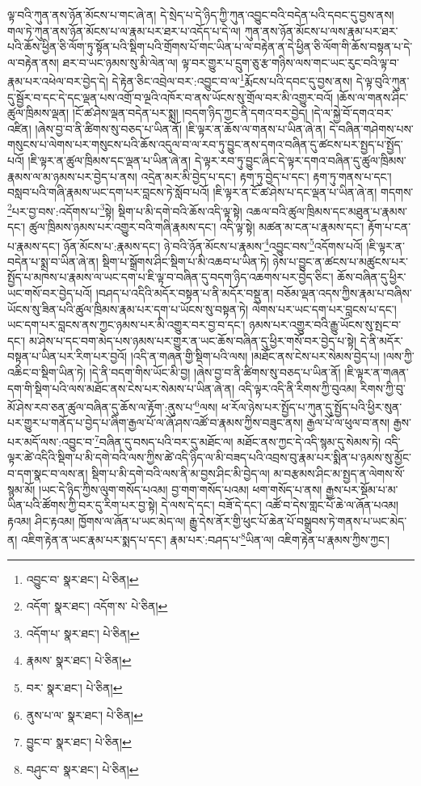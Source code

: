 ལྟ་བའི་ཀུན་ནས་ཉོན་མོངས་པ་གང་ཞེ་ན། དེ་སྲེད་པ་དེ་ཉིད་ཀྱི་ཀུན་འབྱུང་བའི་བདེན་པའི་དབང་དུ་བྱས་ནས། གལ་ཏེ་ཀུན་ནས་ཉོན་མོངས་པ་ལ་རྣམ་པར་ཐར་པ་འདོད་པ་དེ་ལ། ཀུན་ནས་ཉོན་མོངས་པ་ལས་རྣམ་པར་ཐར་པའི་ཆོས་ཕྱིན་ཅི་ལོག་ཏུ་སྟོན་པའི་སྡིག་པའི་གྲོགས་པོ་གང་ཡིན་པ་ལ་བརྟེན་ན་དེ་ཕྱིན་ཅི་ལོག་གི་ཆོས་བསྟན་པ་དེ་ལ་བརྟེན་ནས། ཐར་བ་ཡང་ཉམས་སུ་མི་ལེན་ལ། ལྟ་བར་གྱུར་པ་དྲུག་ཅུ་རྩ་གཉིས་ལས་གང་ཡང་རུང་བའི་ལྟ་བ་རྣམ་པར་འཕེལ་བར་བྱེད་དེ། དེ་རྟེན་ཅིང་འབྲེལ་བར་:འབྱུང་བ་ལ་\footnote{འབྱུང་བ་  སྣར་ཐང་།  པེ་ཅིན། }རྨོངས་པའི་དབང་དུ་བྱས་ནས། དེ་ལྟ་བུའི་ཀུན་དུ་སྦྱོར་བ་དང་དེ་དང་ལྡན་པས་འགྲོ་བ་ལྔའི་འཁོར་བ་ནས་ཡོངས་སུ་གྲོལ་བར་མི་འགྱུར་བའོ། །ཆོས་ལ་གནས་ཤིང་ཚུལ་ཁྲིམས་ལྡན། །ངོ་ཚ་ཤེས་ལྡན་བདེན་པར་སྨྲ། །བདག་ཉིད་ཀྱང་ནི་དགའ་བར་བྱེད། །དེ་ལ་སྐྱེ་བོ་དགའ་བར་འཛིན། །ཞེས་བྱ་བ་ནི་ཚིགས་སུ་བཅད་པ་ཡིན་ནོ། །ཇི་ལྟར་ན་ཆོས་ལ་གནས་པ་ཡིན་ཞེ་ན། དེ་བཞིན་གཤེགས་པས་གསུངས་པ་ལེགས་པར་གསུངས་པའི་ཆོས་འདུལ་བ་ལ་རབ་ཏུ་བྱུང་ནས་དགའ་བཞིན་དུ་ཚངས་པར་སྤྱད་པ་སྤྱོད་པའོ། །ཇི་ལྟར་ན་ཚུལ་ཁྲིམས་དང་ལྡན་པ་ཡིན་ཞེ་ན། དེ་ལྟར་རབ་ཏུ་བྱུང་ཞིང་དེ་ལྟར་དགའ་བཞིན་དུ་ཚུལ་ཁྲིམས་རྣམས་ལ་མ་ཉམས་པར་བྱེད་པ་ནས། འདྲེན་མར་མི་བྱེད་པ་དང་། རྟག་ཏུ་བྱེད་པ་དང་། རྟག་ཏུ་གནས་པ་དང་། བསླབ་པའི་གཞི་རྣམས་ཡང་དག་པར་བླངས་ཏེ་སློབ་པའོ། །ཇི་ལྟར་ན་ངོ་ཚ་ཤེས་པ་དང་ལྡན་པ་ཡིན་ཞེ་ན། གདགས་\footnote{འདོག་  སྣར་ཐང་། འདོག་ས་  པེ་ཅིན། }པར་བྱ་བས་:འདོགས་པ་\footnote{འདོག་པ་  སྣར་ཐང་།  པེ་ཅིན། }སྟེ། སྡིག་པ་མི་དགེ་བའི་ཆོས་འདི་ལྟ་སྟེ། འཆལ་བའི་ཚུལ་ཁྲིམས་དང་མཐུན་པ་རྣམས་དང་། ཚུལ་ཁྲིམས་ཉམས་པར་འགྱུར་བའི་གཞི་རྣམས་དང་། འདི་ལྟ་སྟེ། མཚན་མ་ངན་པ་རྣམས་དང་། རྟོག་པ་ངན་པ་རྣམས་དང་། ཉོན་མོངས་པ་:རྣམས་དང་། ཉེ་བའི་ཉོན་མོངས་པ་རྣམས་\footnote{རྣམས་  སྣར་ཐང་།  པེ་ཅིན། }འབྱུང་བས་\footnote{བར་  སྣར་ཐང་།  པེ་ཅིན། }འདོགས་པའོ། །ཇི་ལྟར་ན་བདེན་པ་སྨྲ་བ་ཡིན་ཞེ་ན། སྡིག་པ་སྒྲོགས་ཤིང་སྡིག་པ་མི་འཆབ་པ་ཡིན་ཏེ། ཉེས་པ་བྱུང་ན་ཚངས་པ་མཚུངས་པར་སྤྱོད་པ་མཁས་པ་རྣམས་ལ་ཡང་དག་པ་ཇི་ལྟ་བ་བཞིན་དུ་བདག་ཉིད་འཆགས་པར་བྱེད་ཅིང་། ཆོས་བཞིན་དུ་ཕྱིར་ཡང་གསོ་བར་བྱེད་པའོ། །བཤད་པ་འདིའི་མདོར་བསྟན་པ་ནི་མདོར་བསྡུ་ན། བཅོམ་ལྡན་འདས་ཀྱིས་རྣམ་པ་བཞིས་ཡོངས་སུ་ཟིན་པའི་ཚུལ་ཁྲིམས་རྣམ་པར་དག་པ་ཡོངས་སུ་བསྟན་ཏེ། ལེགས་པར་ཡང་དག་པར་བླངས་པ་དང་། ཡང་དག་པར་བླངས་ནས་ཀྱང་ཉམས་པར་མི་འགྱུར་བར་བྱ་བ་དང་། ཉམས་པར་འགྱུར་བའི་རྒྱུ་ཡོངས་སུ་སྤང་བ་དང་། མ་ཤེས་པ་དང་བག་མེད་པས་ཉམས་པར་གྱུར་ན་ཡང་ཆོས་བཞིན་དུ་ཕྱིར་གསོ་བར་བྱེད་པ་སྟེ། དེ་ནི་མདོར་བསྟན་པ་ཡིན་པར་རིག་པར་བྱའོ། །འདི་ན་གཞན་གྱི་སྡིག་པའི་ལས། །མཐོང་ནས་ངེས་པར་སེམས་བྱེད་པ། །ལས་ཀྱི་འཆིང་བ་སྡིག་ཡིན་ཏེ། །དེ་ནི་བདག་གིས་ཡོང་མི་བྱ། །ཞེས་བྱ་བ་ནི་ཚིགས་སུ་བཅད་པ་ཡིན་ནོ། །ཇི་ལྟར་ན་གཞན་དག་གི་སྡིག་པའི་ལས་མཐོང་ནས་ངེས་པར་སེམས་པ་ཡིན་ཞེ་ན། འདི་ལྟར་འདི་ནི་རིགས་ཀྱི་བུའམ། རིགས་ཀྱི་བུ་མོ་ཤེས་རབ་ཅན་ཚུལ་བཞིན་དུ་ཆོས་ལ་རྟོག་:ནུས་པ་\footnote{ནུས་པ་ལ་  སྣར་ཐང་།  པེ་ཅིན། }ལས། ཕ་རོལ་ཉེས་པར་སྤྱོད་པ་ཀུན་དུ་སྤྱོད་པའི་ཕྱིར་སུན་པར་གྱུར་པ་གནོད་པ་བྱེད་པ་ཞིག་རྒྱལ་པོ་ལ་ཞོ་ཤས་འཚོ་བ་རྣམས་ཀྱིས་བཟུང་ནས། རྒྱལ་པོ་ལ་ཕུལ་བ་ནས། རྒྱས་པར་མདོ་ལས་:འབྱུང་བ་\footnote{བྱུང་བ་  སྣར་ཐང་།  པེ་ཅིན། }བཞིན་དུ་བསད་པའི་བར་དུ་མཐོང་ལ། མཐོང་ནས་ཀྱང་དེ་འདི་སྙམ་དུ་སེམས་ཏེ། འདི་ལྟར་ཚེ་འདིའི་སྡིག་པ་མི་དགེ་བའི་ལས་ཀྱིས་ཚེ་འདི་ཉིད་ལ་མི་བཟད་པའི་འབྲས་བུ་རྣམ་པར་སྨིན་པ་ཉམས་སུ་མྱོང་བ་དག་སྣང་བ་ལས་ན། སྡིག་པ་མི་དགེ་བའི་ལས་ནི་མ་བྱས་ཤིང་མི་བྱེད་ལ། མ་བརྩམས་ཤིང་མ་སྤྱད་ན་ལེགས་སོ་སྙམ་མོ། །ཡང་དེ་ཉིད་ཀྱིས་ལུག་གསོད་པའམ། བྱ་གག་གསོད་པའམ། ཕག་གསོད་པ་ནས། རྒྱས་པར་སྡོམ་པ་མ་ཡིན་པའི་ཚོགས་ཀྱི་བར་དུ་རིག་པར་བྱ་སྟེ། དེ་ལས་དེ་དང་། བཟོ་དེ་དང་། འཚོ་བ་དེས་གླང་པོ་ཆེ་ལ་ཞོན་པའམ། རྟའམ། ཤིང་རྟའམ། ཁྱོགས་ལ་ཞོན་པ་ཡང་མེད་ལ། རྒྱུ་དེས་ནོར་གྱི་ཕུང་པོ་ཆེན་པོ་བསྒྲུབས་ཏེ་གནས་པ་ཡང་མེད་ན། འཇིག་རྟེན་ན་ཡང་རྣམ་པར་སྨད་པ་དང་། རྣམ་པར་:བཤད་པ་\footnote{བཤུང་བ་  སྣར་ཐང་།  པེ་ཅིན། }ཡིན་ལ། འཇིག་རྟེན་པ་རྣམས་ཀྱིས་ཀྱང་། 